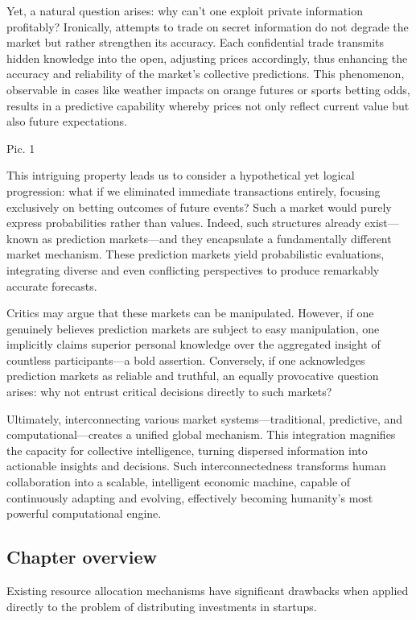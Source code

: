 \documentclass[12pt]{article}
\begin{document}
Yet, a natural question arises: why can't one exploit private information profitably? Ironically, attempts to trade on secret information do not degrade the market but rather strengthen its accuracy. Each confidential trade transmits hidden knowledge into the open, adjusting prices accordingly, thus enhancing the accuracy and reliability of the market's collective predictions. This phenomenon, observable in cases like weather impacts on orange futures or sports betting odds, results in a predictive capability whereby prices not only reflect current value but also future expectations.

Pic. 1

This intriguing property leads us to consider a hypothetical yet logical progression: what if we eliminated immediate transactions entirely, focusing exclusively on betting outcomes of future events? Such a market would purely express probabilities rather than values. Indeed, such structures already exist—known as prediction markets—and they encapsulate a fundamentally different market mechanism. These prediction markets yield probabilistic evaluations, integrating diverse and even conflicting perspectives to produce remarkably accurate forecasts.

Critics may argue that these markets can be manipulated. However, if one genuinely believes prediction markets are subject to easy manipulation, one implicitly claims superior personal knowledge over the aggregated insight of countless participants—a bold assertion. Conversely, if one acknowledges prediction markets as reliable and truthful, an equally provocative question arises: why not entrust critical decisions directly to such markets?

Ultimately, interconnecting various market systems—traditional, predictive, and computational—creates a unified global mechanism. This integration magnifies the capacity for collective intelligence, turning dispersed information into actionable insights and decisions. Such interconnectedness transforms human collaboration into a scalable, intelligent economic machine, capable of continuously adapting and evolving, effectively becoming humanity's most powerful computational engine.


\subsection{Chapter overview}
Existing resource allocation mechanisms have significant drawbacks when applied directly to the problem of distributing investments in startups.
\end{document}
